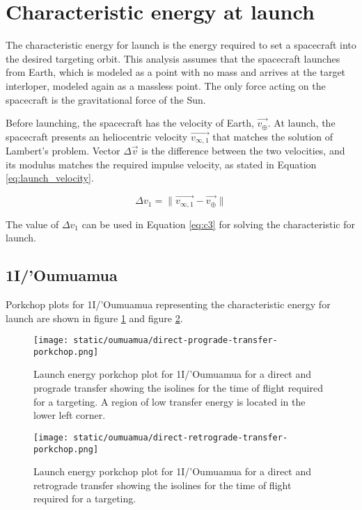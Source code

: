 \section{Characteristic energy at launch}

The characteristic energy for launch is the energy required to set a spacecraft
into the desired targeting orbit. This analysis assumes that the spacecraft
launches from Earth, which is modeled as a point with no mass and arrives at the
target interloper, modeled again as a massless point. The only force acting on
the spacecraft is the gravitational force of the Sun.

Before launching, the spacecraft has the velocity of Earth, $\vec{v_{\oplus}}$.
At launch, the spacecraft presents an heliocentric velocity $\vec{v_{\infty
        ,1}}$ that matches the solution of Lambert's problem. Vector $\Delta{\vec{v}}$
is the difference between the two velocities, and its modulus matches the
required impulse velocity, as stated in Equation \ref{eq:launch_velocity}.

\begin{equation}
  \Delta v_1 = \|\vec{v_{\infty ,1}} - \vec{v_{\oplus}}\|
  \label{eq:launch_velocity}
\end{equation}

The value of $\Delta v_1$ can be used in Equation \ref{eq:c3} for solving the
characteristic for launch.

\subsection{1I/'Oumuamua}

Porkchop plots for 1I/'Oumuamua representing the characteristic energy for launch
are shown in figure \ref{fig:oumuamua-direct-prograde-transfer-porkchop} and
figure \ref{fig:oumuamua-direct-retrograde-transfer-porkchop}.

\begin{figure}[H]
  \centering
  \texttt{[image: static/oumuamua/direct-prograde-transfer-porkchop.png]}
  \caption[Direct and prograde launch energy porkchop for 1I/'Oumuamua]{Launch energy porkchop plot for 1I/'Oumuamua for a direct and prograde
    transfer showing the isolines for
    the time of flight required for a targeting. A region of low transfer
    energy is located in the lower left corner.}
  \label{fig:oumuamua-direct-prograde-transfer-porkchop}
\end{figure}

\begin{figure}[H]
  \centering
  \texttt{[image: static/oumuamua/direct-retrograde-transfer-porkchop.png]}
  \caption[Direct and retrograde launch energy porkchop for
    1I/'Oumuamua]{Launch energy porkchop plot for 1I/'Oumuamua for a direct and
    retrograde transfer showing the isolines for
    the time of flight required for a targeting.}
  \label{fig:oumuamua-direct-retrograde-transfer-porkchop}
\end{figure}

